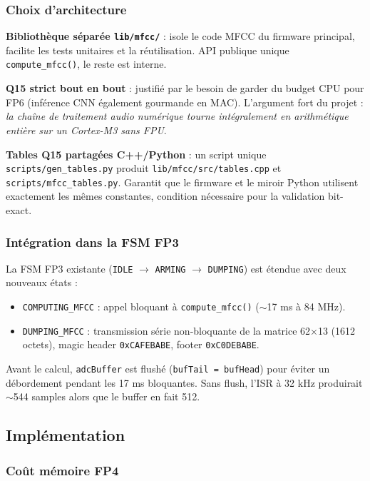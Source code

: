 \subsubsection{Choix d'architecture}

\textbf{Bibliothèque séparée \texttt{lib/mfcc/}} : isole le code MFCC du firmware principal, facilite les tests unitaires et la réutilisation. API publique unique \texttt{compute\_mfcc()}, le reste est interne.

\textbf{Q15 strict bout en bout} : justifié par le besoin de garder du budget CPU pour FP6 (inférence CNN également gourmande en MAC). L'argument fort du projet : \emph{la chaîne de traitement audio numérique tourne intégralement en arithmétique entière sur un Cortex-M3 sans FPU}.

\textbf{Tables Q15 partagées C++/Python} : un script unique \verb|scripts/gen_tables.py| produit \verb|lib/mfcc/src/tables.cpp| et \verb|scripts/mfcc_tables.py|. Garantit que le firmware et le miroir Python utilisent exactement les mêmes constantes, condition nécessaire pour la validation bit-exact.

\subsubsection{Intégration dans la FSM FP3}

La FSM FP3 existante (\texttt{IDLE} $\rightarrow$ \texttt{ARMING} $\rightarrow$ \texttt{DUMPING}) est étendue avec deux nouveaux états :

\begin{itemize}
    \item \texttt{COMPUTING\_MFCC} : appel bloquant à \verb|compute_mfcc()| ($\sim$17 ms à 84 MHz).
    \item \texttt{DUMPING\_MFCC} : transmission série non-bloquante de la matrice 62×13 (1612 octets), magic header \verb|0xCAFEBABE|, footer \verb|0xC0DEBABE|.
\end{itemize}

Avant le calcul, \verb|adcBuffer| est flushé (\verb|bufTail = bufHead|) pour éviter un débordement pendant les 17 ms bloquantes. Sans flush, l'ISR à 32 kHz produirait $\sim$544 samples alors que le buffer en fait 512.

\subsection{Implémentation}

\subsubsection{Coût mémoire FP4}

